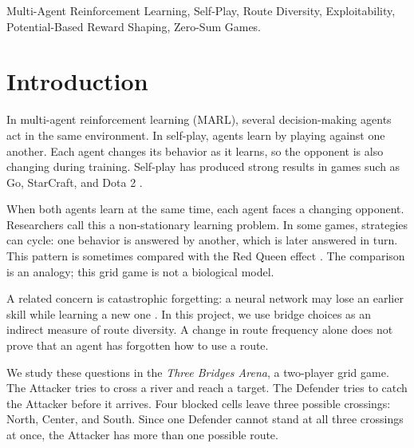 \documentclass[conference]{IEEEtran}
\begin{document}
\begin{IEEEkeywords}
Multi-Agent Reinforcement Learning, Self-Play, Route Diversity, Exploitability, Potential-Based Reward Shaping, Zero-Sum Games.
\end{IEEEkeywords}

\section{Introduction}
In multi-agent reinforcement learning (MARL), several decision-making agents act in the same environment. In self-play, agents learn by playing against one another. Each agent changes its behavior as it learns, so the opponent is also changing during training. Self-play has produced strong results in games such as Go, StarCraft, and Dota 2 \cite{silver2016mastering, vinyals2019alphastar, berner2019dota}.

When both agents learn at the same time, each agent faces a changing opponent. Researchers call this a non-stationary learning problem. In some games, strategies can cycle: one behavior is answered by another, which is later answered in turn. This pattern is sometimes compared with the Red Queen effect \cite{balduzzi2019open, cliff1995tracking}. The comparison is an analogy; this grid game is not a biological model.

A related concern is catastrophic forgetting: a neural network may lose an earlier skill while learning a new one \cite{mccloskey1989catastrophic}. In this project, we use bridge choices as an indirect measure of route diversity. A change in route frequency alone does not prove that an agent has forgotten how to use a route.

We study these questions in the \textit{Three Bridges Arena}, a two-player grid game. The Attacker tries to cross a river and reach a target. The Defender tries to catch the Attacker before it arrives. Four blocked cells leave three possible crossings: North, Center, and South. Since one Defender cannot stand at all three crossings at once, the Attacker has more than one possible route.
\end{document}
